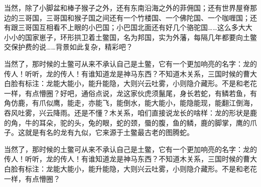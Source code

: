 \documentclass{article}%
\begin{document}
当然，除了小脚盆和棒子猴子之外，还有东南沿海之外的菲佣国；还有世界屋脊那边的三哥国，三哥国和猴子国之间还有一个竹楼国、一个佛陀国、一个咖喱国；还有跟三哥国互相看不上眼的小巴国；小巴国北面还有好几个骆驼国……这么多大大小小的国家崽子，环形拱卫着土鳖国，名为邦国，实为外藩，每隔几年都要向土鳖交保护费的说……背景如此复杂，精彩吧？

\lipsum[1-3]

当然了，那时候的土鳖可从来不承认自己是土鳖，它有一个更加响亮的名字：龙的传人！听听，龙的传人！有谁知道龙是神马东西？不知道木关系，三国时候的曹大白脸有标注：龙能大能小，能升能隐，大则兴云吐雾，小则隐介藏形。不是和老花一样，有点懵圈？好吧，通俗点说，龙这家伙虎须鬣尾，身长若蛇，有鳞若鱼，有角仿鹿，有爪似鹰，能走，亦能飞，能倒水，能大能小，能隐能现，能翻江倒海，吞风吐雾，兴云降雨。还是不懂？木关系，咱们直接说龙长的啥样：龙的形状是鹿的角，牛的耳朵，驼的头，兔的眼，蛇的颈，蜃的腹，鱼的鳞，鹿的脚掌，鹰的爪子。这就是有名的龙有九似，它来源于土鳖最古老的图腾蛇。

\lipsum[1-2]

当然了，那时候的土鳖可从来不承认自己是土鳖，它有一个更加响亮的名字：龙的传人！听听，龙的传人！有谁知道龙是神马东西？不知道木关系，三国时候的曹大白脸有标注：龙能大能小，能升能隐，大则兴云吐雾，小则隐介藏形。不是和老花一样，有点懵圈？

\lipsum[3]
\end{document}
